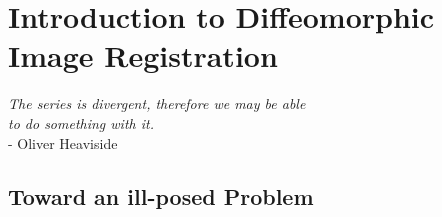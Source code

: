 \chapter{Introduction to Diffeomorphic Image Registration}\label{ch:introduction}


\begin{flushright}
		\emph{The series is divergent, therefore we may be able \\ to do something with it.}\\
			- Oliver Heaviside
\end{flushright}



\section{Toward an ill-posed Problem}


